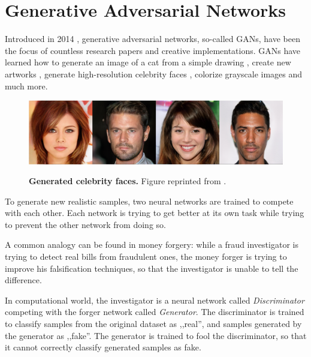 \documentclass[12pt]{report}
\begin{document}
\section{Generative Adversarial Networks}

Introduced in 2014 \cite{goodfellow_generative_2014}, generative adversarial  networks, so-called GANs, have been the focus of countless research papers and creative implementations. GANs have learned how to generate an image of a cat from a simple drawing \cite{hesse_image--image_nodate}, create new artworks \cite{rkjones4_gangogh_2018}, generate high-resolution celebrity faces \cite{karras_progressive_2017}, colorize grayscale images and much more.

\begin{figure}[b]
\centering
{\includegraphics[width=\linewidth]{02_background/gan_faces}}
\caption{\label{fig:mnist} \textbf{Generated celebrity faces.} Figure reprinted from \cite{karras_progressive_2017}.}
\end{figure}

To generate new realistic samples, two neural networks are trained to compete with each other. Each network is trying to get better at its own task while trying to prevent the other network from doing so. 

A common analogy can be found in money forgery: while a fraud investigator is trying to detect real bills from fraudulent ones, the money forger is trying to improve his falsification techniques, so that the investigator is unable to tell the difference.

In computational world, the investigator is a neural network called \textit{Discriminator} competing with the forger network called \textit{Generator}. The discriminator is trained to classify samples from the original dataset as ,,real'', and samples generated by the generator as ,,fake''. The generator is trained to fool the discriminator, so that it cannot correctly classify generated samples as fake.
\end{document}
